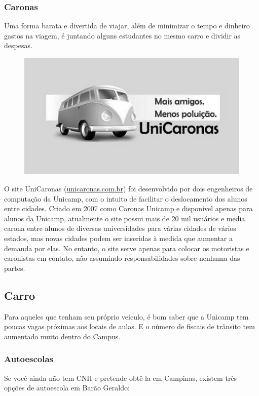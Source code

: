 \subsubsection*{Caronas}

Uma forma barata e divertida de viajar, além de minimizar o tempo e dinheiro
gastos na viagem, é juntando alguns estudantes no mesmo carro e dividir as
despesas.
\begin{figure}[h!]
    \centering
    \includegraphics[width=.45\textwidth]{img/barao/unicaronas.jpg}
\end{figure}

O site UniCaronas (\url{unicaronas.com.br}) foi desenvolvido por dois
engenheiros de computação da Unicamp, com o intuito de facilitar o deslocamento
dos alunos entre cidades. Criado em 2007 como Caronas Unicamp e disponível 
apenas para alunos da Unicamp, atualmente o site possui mais de 20 mil usuários 
e media carona entre alunos de diversas universidades para várias cidades de 
vários estados, mas novas cidades podem ser inseridas à medida que aumentar a 
demanda por elas. No entanto, o site serve apenas para colocar os motoristas e 
caronistas em contato, não assumindo responsabilidades sobre nenhuma das partes.

\subsection{Carro}

Para aqueles que tenham seu próprio veículo, é bom saber que a Unicamp tem
poucas vagas próximas aos locais de aulas. E o número de fiscais de trânsito tem
aumentado muito dentro do Campus.

\subsubsection*{Autoescolas}

Se você ainda não tem CNH e pretende obtê-la em Campinas, existem três opções de
autoescola em Barão Geraldo:

